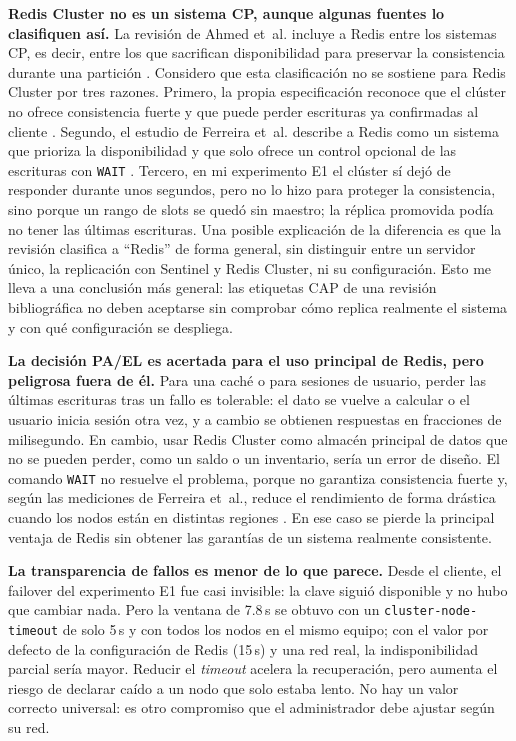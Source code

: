 \documentclass[11pt,a4paper]{article}
\begin{document}
\textbf{Redis Cluster no es un sistema CP, aunque algunas fuentes lo
clasifiquen así.} La revisión de Ahmed et~al. incluye a Redis entre los
sistemas CP, es decir, entre los que sacrifican disponibilidad para preservar
la consistencia durante una partición \cite[p.~172]{ahmed2023consistency}.
Considero que esta clasificación no se sostiene para Redis Cluster por tres
razones. Primero, la propia especificación reconoce que el clúster no ofrece
consistencia fuerte y que puede perder escrituras ya confirmadas al cliente
\cite{redis2026clusterspec}. Segundo, el estudio de Ferreira et~al. describe a
Redis como un sistema que prioriza la disponibilidad y que solo ofrece un
control opcional de las escrituras con \texttt{WAIT}
\cite[p.~4]{ferreira2024impacts}. Tercero, en mi experimento E1 el clúster sí
dejó de responder durante unos segundos, pero no lo hizo para proteger la
consistencia, sino porque un rango de slots se quedó sin maestro; la réplica
promovida podía no tener las últimas escrituras. Una posible explicación de
la diferencia es que la revisión clasifica a ``Redis'' de forma general, sin
distinguir entre un servidor único, la replicación con Sentinel y Redis
Cluster, ni su configuración. Esto me lleva a una conclusión más general: las
etiquetas CAP de una revisión bibliográfica no deben aceptarse sin comprobar
cómo replica realmente el sistema y con qué configuración se despliega.

\textbf{La decisión PA/EL es acertada para el uso principal de Redis, pero
peligrosa fuera de él.} Para una caché o para sesiones de usuario, perder las
últimas escrituras tras un fallo es tolerable: el dato se vuelve a calcular o
el usuario inicia sesión otra vez, y a cambio se obtienen respuestas en
fracciones de milisegundo. En cambio, usar Redis Cluster como almacén
principal de datos que no se pueden perder, como un saldo o un inventario, sería
un error de diseño. El comando \texttt{WAIT} no resuelve el problema, porque
no garantiza consistencia fuerte \cite{redis2026clusterspec} y, según las
mediciones de Ferreira et~al., reduce el rendimiento de forma drástica cuando
los nodos están en distintas regiones \cite{ferreira2024impacts,
ferreira2025benchmarking}. En ese caso se pierde la principal ventaja de Redis
sin obtener las garantías de un sistema realmente consistente.

\textbf{La transparencia de fallos es menor de lo que parece.} Desde el
cliente, el failover del experimento E1 fue casi invisible: la clave siguió
disponible y no hubo que cambiar nada. Pero la ventana de 7.8\,s se obtuvo con
un \texttt{cluster-node-timeout} de solo 5\,s y con todos los nodos en el
mismo equipo; con el valor por defecto de la configuración de Redis
(15\,s) y una red real, la indisponibilidad parcial sería mayor. Reducir el
\emph{timeout} acelera la recuperación, pero aumenta el riesgo de declarar
caído a un nodo que solo estaba lento. No hay un valor correcto universal: es
otro compromiso que el administrador debe ajustar según su red.
\end{document}
